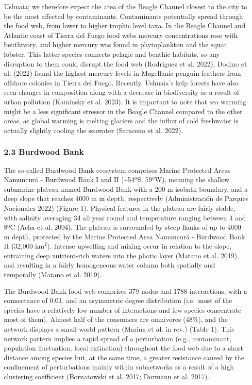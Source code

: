 \documentclass[
]{article}
\begin{document}
Ushuaia; we therefore expect the area of the Beagle Channel closest to
the city to be the most affected by contaminants. Contaminants
potentially spread through the food web, from lower to higher trophic
level taxa. In the Beagle Channel and Atlantic coast of Tierra del Fuego
food webs mercury concentrations rose with benthivory, and higher
mercury was found in phytoplankton and the squat lobster. This latter
species connects pelagic and benthic habitats, so any disruption to them
could disrupt the food web (Rodriguez et al. 2022). Dodino et al. (2022)
found the highest mercury levels in Magellanic penguin feathers from
offshore colonies in Tierra del Fuego. Recently, Ushuaia's kelp forests
have also seen changes in composition along with a decrease in
biodiversity as a result of urban pollution (Kaminsky et al. 2023). It
is important to note that sea warming might be a less significant
stressor in the Beagle Channel compared to the other areas, as global
warming is melting glaciers and the influx of cold freshwater is
actually slightly cooling the seawater (Saraceno et al. 2022).

\subsubsection{2.3 Burdwood Bank}\label{burdwood-bank}

The so-called Burdwood Bank ecosystem comprises Marine Protected Areas
Namuncurá - Burdwood Bank I and II (\textasciitilde54ºS, 59ºW), meaning
the shallow submarine plateau named Burdwood Bank with a 200 m isobath
boundary, and a deep slope that reaches 4000 m in depth, respectively
(Administración de Parques Nacionales 2022) (Figure 1). Physical
features in the plateau are fairly stable, with salinity averaging 34
all year round and temperature ranging between 4 and 8ºC (Acha et al.
2004). The plateau is surrounded by steep flanks of up to 4000 m depth,
protected by the Marine Protected Area Namuncurá - Burdwood Bank II
(32,000 \(\text{km}^2\)). Intense upwelling and mixing occur in relation
to the slope, entraining deep nutrient-rich waters into the photic layer
(Matano et al. 2019), and resulting in a fairly homogeneous water column
both spatially and temporally (Matano et al. 2019).

The Burdwood Bank food web comprises 379 nodes and 1788 interactions,
with a connectance of 0.01, and an asymmetric degree distribution
(i.e.~most of the species have a relatively low number of interactions
and few species concentrate most of them). Almost half of the consumers
are omnivores (48\%), and the network displays a small-world pattern
(Marina et al. in rev.) (Table 1). This network pattern implies a rapid
spread of a perturbation (e.g., contaminant, population fluctuation,
local extinction) throughout the food web due to a short distance among
species but, at the same time, a greater resistance caused by the
confinement of perturbations mainly within subnetworks as a result of a
high clustering coefficient (Bornatowski et al. 2017; Dormann et al.
2017).
\end{document}
